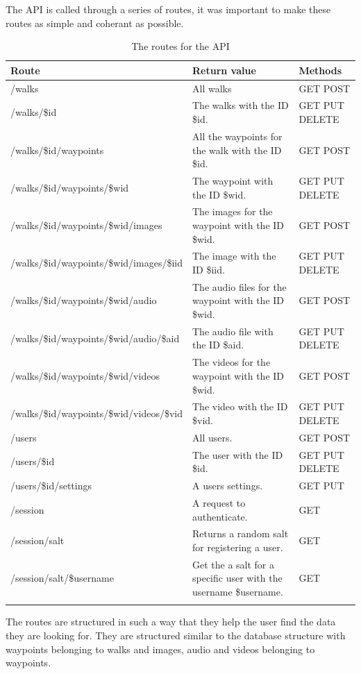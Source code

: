 \documentclass[11pt,a4paper]{article}
\begin{document}
The API is called through a series of routes, it was important to make these routes as simple and coherant as possible.

\begin{longtable}{m{}|m{}|C{0.11\textwidth}}
    \textbf{Route} & \textbf{Return value} & \textbf{Methods} \\\hline
    /walks & All walks & GET POST\\ \hline
    /walks/\$id & The walks with the ID \$id. & GET PUT DELETE\\ \hline
    /walks/\$id/waypoints & All the waypoints for the walk with the ID \$id. & GET POST\\ \hline
    /walks/\$id/waypoints/\$wid & The waypoint with the ID \$wid. & GET PUT DELETE \\ \hline
    /walks/\$id/waypoints/\$wid/images & The images for the waypoint with the ID \$wid. & GET POST \\ \hline
    /walks/\$id/waypoints/\$wid/images/\$iid & The image with the ID \$iid. & GET PUT DELETE \\ \hline
    /walks/\$id/waypoints/\$wid/audio & The audio files for the waypoint with the ID \$wid. & GET POST \\ \hline
    /walks/\$id/waypoints/\$wid/audio/\$aid & The audio file with the ID \$aid. & GET PUT DELETE \\ \hline
    /walks/\$id/waypoints/\$wid/videos & The videos for the waypoint with the ID \$wid. & GET POST \\ \hline
    /walks/\$id/waypoints/\$wid/videos/\$vid & The video with the ID \$vid. & GET PUT DELETE \\ \hline
    /users & All users. & GET POST \\\hline
    /users/\$id & The user with the ID \$id. & GET PUT DELETE \\\hline
    /users/\$id/settings & A users settings. & GET PUT \\\hline
    /session & A request to authenticate. & GET\\\hline
    /session/salt & Returns a random salt for registering a user. & GET\\\hline
    /session/salt/\$username & Get the a salt for a specific user with the username \$username. & GET\\
    \caption {The routes for the API}
    \label{routes}
\end{longtable}

The routes are structured in such a way that they help the user find the data they are looking for. They are structured similar to the database structure with waypoints belonging to walks and images, audio and videos belonging to waypoints. 
\end{document}
